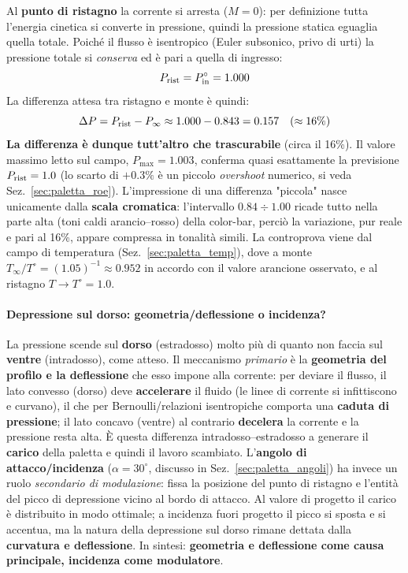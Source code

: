 Al \textbf{punto di ristagno} la corrente si arresta ($M = 0$): per definizione tutta l'energia
cinetica si converte in pressione, quindi la pressione statica eguaglia quella totale. Poiché il
flusso è isentropico (Euler subsonico, privo di urti) la pressione totale si \emph{conserva} ed è
pari a quella di ingresso:
\begin{equation}
  P_{\rm rist} = P^\circ_{\rm in} = 1.000
\end{equation}
La differenza attesa tra ristagno e monte è quindi:
\begin{equation}
  \Delta P = P_{\rm rist} - P_\infty \approx 1.000 - 0.843 = 0.157 \quad (\approx 16\%)
\end{equation}
\textbf{La differenza è dunque tutt'altro che trascurabile} (circa il 16\%). Il valore massimo
letto sul campo, $P_{\max} = 1.003$, conferma quasi esattamente la previsione $P_{\rm rist} = 1.0$
(lo scarto di $+0.3\%$ è un piccolo \emph{overshoot} numerico, si veda
Sez.~\ref{sec:paletta_roe}). L'impressione di una differenza "piccola" nasce unicamente dalla
\textbf{scala cromatica}: l'intervallo $0.84 \div 1.00$ ricade tutto nella parte alta (toni caldi
arancio--rosso) della color-bar, perciò la variazione, pur reale e pari al 16\%, appare compressa
in tonalità simili. La controprova viene dal campo di temperatura (Sez.~\ref{sec:paletta_temp}),
dove a monte $T_\infty/T^\circ = (1.05)^{-1} \approx 0.952$ in accordo con il valore arancione
osservato, e al ristagno $T \to T^\circ = 1.0$.

\paragraph{Depressione sul dorso: geometria/deflessione o incidenza?}
La pressione scende sul \textbf{dorso} (estradosso) molto più di quanto non faccia sul
\textbf{ventre} (intradosso), come atteso. Il meccanismo \emph{primario} è la
\textbf{geometria del profilo e la deflessione} che esso impone alla corrente: per deviare il
flusso, il lato convesso (dorso) deve \textbf{accelerare} il fluido (le linee di corrente si
infittiscono e curvano), il che per Bernoulli/relazioni isentropiche comporta una
\textbf{caduta di pressione}; il lato concavo (ventre) al contrario \textbf{decelera} la corrente
e la pressione resta alta. È questa differenza intradosso--estradosso a generare il
\textbf{carico} della paletta e quindi il lavoro scambiato. L'\textbf{angolo di attacco/incidenza}
($\alpha = 30^\circ$, discusso in Sez.~\ref{sec:paletta_angoli}) ha invece un ruolo
\emph{secondario di modulazione}: fissa la posizione del punto di ristagno e l'entità del picco di
depressione vicino al bordo di attacco. Al valore di progetto il carico è distribuito in modo
ottimale; a incidenza fuori progetto il picco si sposta e si accentua, ma la natura della
depressione sul dorso rimane dettata dalla \textbf{curvatura e deflessione}. In sintesi:
\textbf{geometria e deflessione come causa principale, incidenza come modulatore}.

